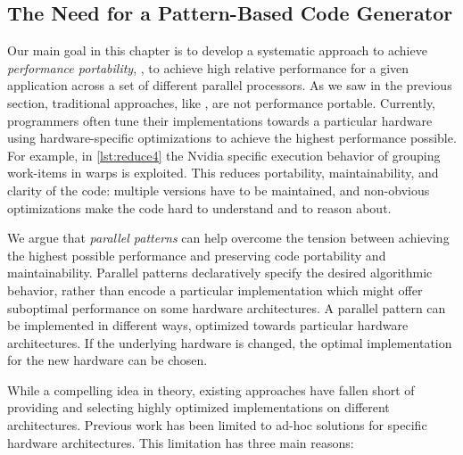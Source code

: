 

\subsection{The Need for a Pattern-Based Code Generator}

Our main goal in this chapter is to develop a systematic approach to achieve \emph{performance portability}, \ie, to achieve high relative performance for a given application across a set of different parallel processors.
As we saw in the previous section, traditional approaches, like \OpenCL, are not performance portable.
Currently, programmers often tune their implementations towards a particular hardware using hardware-specific optimizations to achieve the highest performance possible.
For example, in \autoref{lst:reduce4} the Nvidia specific execution behavior of grouping work-items in warps is exploited.
This reduces portability, maintainability, and clarity of the code:
multiple versions have to be maintained, and non-obvious optimizations make the code hard to understand and to reason about.

We argue that \emph{parallel patterns} can help overcome the tension between achieving the highest possible performance and preserving code portability and maintainability.
Parallel patterns declaratively specify the desired algorithmic behavior, rather than encode a particular implementation which might offer suboptimal performance on some hardware architectures.
A parallel pattern can be implemented in different ways, optimized towards particular hardware architectures.
If the underlying hardware is changed, the optimal implementation for the new hardware can be chosen.

While a compelling idea in theory, existing approaches have fallen short of providing and selecting highly optimized implementations on different architectures.
Previous work has been limited to ad-hoc solutions for specific hardware architectures.
This limitation has three main reasons:


